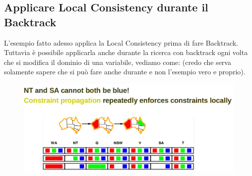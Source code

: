 \subsection{Applicare Local Consistency durante il Backtrack}
L'esempio fatto adesso applica la Local Consistency prima di fare Backtrack. Tuttavia è possibile applicarla anche durante la ricerca con backtrack ogni volta che si modifica il dominio di una variabile, vediamo come: (credo che serva solamente sapere che si può fare anche durante e non l'esempio vero e proprio).
\begin{figure}[H]
    \centering
    \includegraphics[width=12cm, keepaspectratio]{img/Cap3/prova3.png}
\end{figure}

